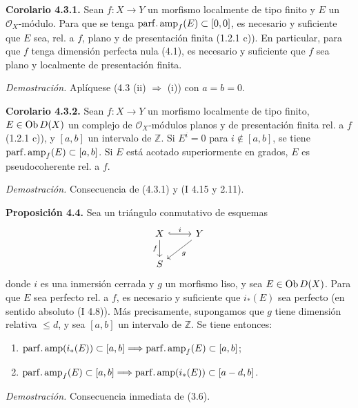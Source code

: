 \providecommand{\sisi}[2]{#2}

\textbf{Corolario 4.3.1.} Sean \(f:X\to Y\) un morfismo localmente de tipo finito y \(E\) un \(\mathcal O_X\)-módulo. Para que se tenga \(\operatorname{parf.amp}_f(E)\subset[0,0]\), es necesario y suficiente que \(E\) sea, rel. a \(f\), plano y de presentación finita (1.2.1 c)). En particular, para que \(f\) tenga dimensión perfecta nula (4.1), es necesario y suficiente que \(f\) sea plano y localmente de presentación finita.

\emph{Demostración.} Aplíquese (4.3 (ii) \(\Longrightarrow\) (i)) con \(a=b=0\).

\textbf{Corolario 4.3.2.} Sean \(f:X\to Y\) un morfismo localmente de tipo finito, \(E\in\operatorname{Ob} D(X)\) un complejo de \(\mathcal O_X\)-módulos planos y de presentación finita rel. a \(f\) (1.2.1 c)), y \([a,b]\) un intervalo de \(\mathbb Z\). Si \(E^i=0\) para \(i\notin[a,b]\), se tiene \(\operatorname{parf.amp}_f(E)\subset[a,b]\). Si \(E\) está acotado superiormente en grados, \(E\) es pseudocoherente rel. a \(f\).

\emph{Demostración.} Consecuencia de (4.3.1) y (I 4.15 y 2.11).

\textbf{Proposición 4.4.} Sea un triángulo conmutativo de esquemas
\[
\begin{tikzcd}
X \arrow[r,hook,"i"] \arrow[d,"f"'] & Y \arrow[dl,"g"]\\
S &
\end{tikzcd}
\]
donde \(i\) es una inmersión cerrada y \(g\) un morfismo liso, y sea \(E\in\operatorname{Ob} D(X)\). Para que \(E\) sea perfecto rel. a \(f\), es necesario y suficiente que \(i_*(E)\) sea perfecto (en sentido absoluto (I 4.8)). Más precisamente, supongamos que \(g\) tiene dimensión relativa \(\leq d\), y sea \([a,b]\) un intervalo de \(\mathbb Z\). Se tiene entonces:
\begin{enumerate}[label=(\roman*)]
\item \(\sisi{\parfamp(i_*(E)}{\parfamp(i_*(E))}\subset[a,b]\Longrightarrow\parfamp_f(E)\subset[a,b]\);
\item \(\operatorname{parf.amp}_f(E)\subset[a,b]\Longrightarrow\operatorname{parf.amp}(i_*(E))\subset[a-d,b]\).
\end{enumerate}

\emph{Demostración.} Consecuencia inmediata de (3.6).

